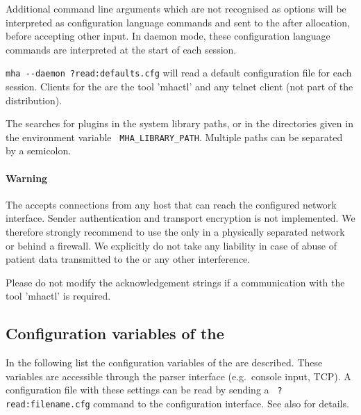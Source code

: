 Additional command line arguments which are not recognised as options
will be interpreted as \mha{} configuration language commands and sent to the
\mhad{} after allocation, before accepting other input.
%
In daemon mode, these \mha{} configuration language commands are interpreted at the 
start of each session.

\verb!mha --daemon ?read:defaults.cfg! will read a default
configuration file for each session.
%
Clients for the \mhad{} are the \Matlab{} tool 'mhactl' and any
telnet client (not part of the distribution).

The \mhad{} searches for \mha{} plugins in the system library paths, or in
the directories given in the environment variable {\tt
MHA\_LIBRARY\_PATH}.
%
Multiple paths can be separated by a semicolon.

\paragraph{Warning}

The \mhad{} accepts connections from any host that can reach
the configured network interface.
%
Sender authentication and transport encryption is not implemented.
%
We therefore strongly recommend to use the \mhad{} only in a
physically separated network or behind a firewall.
%
We explicitly do not take any liability in case of abuse of patient
data transmitted to the \mhad{} or any other interference.

Please do not modify the acknowledgement strings if a communication
with the \Matlab{} tool 'mhactl' is required.

\subsection{Configuration variables of the \mhad{}}

In the following list the configuration variables of the \mhad{} are
described. These variables are accessible through the parser interface
(e.g.\ console input, TCP).
%
A configuration file with these settings can be read by sending a {\tt
?read:filename.cfg} command to the configuration interface. See also
 for details.

